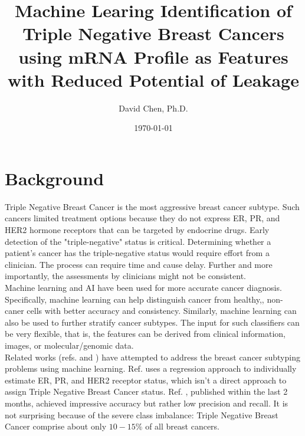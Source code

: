 \documentclass[11pt]{diazessay}
\title{\Large \textbf{Machine Learing Identification of Triple Negative Breast Cancers using mRNA Profile as Features with Reduced Potential of Leakage}}
\author{David Chen, Ph.D.}
\date{\today}
\begin{document}
\maketitle



\section{Background}

Triple Negative Breast Cancer is the most aggressive breast cancer subtype. Such cancers limited treatment options because they do not express ER, PR, and HER2 hormone receptors that can be targeted by endocrine drugs. Early detection of the "triple-negative" status is critical. Determining whether a patient's cancer has the triple-negative status would require effort from a clinician. The process can require time and cause delay. Further and more importantly, the assessments by clinicians might not be consistent. \\

Machine learning and AI have been used for more accurate cancer diagnosis. Specifically, machine learning can help distinguish cancer from healthy,, non-caner cells with better accuracy and consistency. Similarly, machine learning can also be used to further stratify cancer subtypes. The input for such classifiers can be very flexible, that is, the features can be derived from clinical information, images, or molecular/genomic data. \\

Related works (refs.\cite{lehmann2011} and \cite{wu2021}) have attempted to address the breast cancer subtyping problems using machine learning. Ref.\cite{lehmann2011} uses a regression approach to individually estimate ER, PR, and HER2 receptor status, which isn't a direct approach to assign Triple Negative Breast Cancer status. Ref. \cite{wu2021}, published within the last 2 months, achieved impressive accuracy but rather low precision and recall. It is not surprising because of the severe class imbalance: Triple Negative Breast Cancer comprise about only $10-15\%$ of all breast cancers. \\
\end{document}
